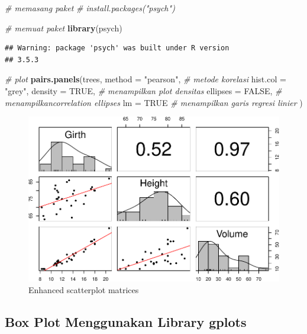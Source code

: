 \documentclass[]{book}
\newenvironment{Shaded}{\begin{snugshade}}{\end{snugshade}}
\newcommand{\KeywordTok}[1]{\textcolor[rgb]{0.13,0.29,0.53}{\textbf{#1}}}
\newcommand{\DataTypeTok}[1]{\textcolor[rgb]{0.13,0.29,0.53}{#1}}
\newcommand{\StringTok}[1]{\textcolor[rgb]{0.31,0.60,0.02}{#1}}
\newcommand{\CommentTok}[1]{\textcolor[rgb]{0.56,0.35,0.01}{\textit{#1}}}
\newcommand{\OtherTok}[1]{\textcolor[rgb]{0.56,0.35,0.01}{#1}}
\newcommand{\NormalTok}[1]{#1}
\begin{document}
\begin{Shaded}
\begin{Highlighting}[]
\CommentTok{# memasang paket}
\CommentTok{# install.packages("psych")}

\CommentTok{# memuat paket}
\KeywordTok{library}\NormalTok{(psych)}
\end{Highlighting}
\end{Shaded}

\begin{verbatim}
## Warning: package 'psych' was built under R version
## 3.5.3
\end{verbatim}

\begin{Shaded}
\begin{Highlighting}[]
\CommentTok{# plot}
\KeywordTok{pairs.panels}\NormalTok{(trees, }
             \DataTypeTok{method =} \StringTok{"pearson"}\NormalTok{, }\CommentTok{# metode korelasi}
             \DataTypeTok{hist.col =} \StringTok{"grey"}\NormalTok{,}
             \DataTypeTok{density =} \OtherTok{TRUE}\NormalTok{,  }\CommentTok{# menampilkan plot densitas}
             \DataTypeTok{ellipses =} \OtherTok{FALSE}\NormalTok{, }\CommentTok{# menampilkancorrelation ellipses}
             \DataTypeTok{lm =} \OtherTok{TRUE} \CommentTok{# menampilkan garis regresi linier}
\NormalTok{             )}
\end{Highlighting}
\end{Shaded}

\begin{figure}

{\centering \includegraphics[width=0.7\linewidth]{EnvStat_files/figure-latex/psychscatter-1} 

}

\caption{Enhanced scatterplot matrices}\label{fig:psychscatter}
\end{figure}

\subsection{Box Plot Menggunakan Library
gplots}\label{box-plot-menggunakan-library-gplots}
\end{document}
